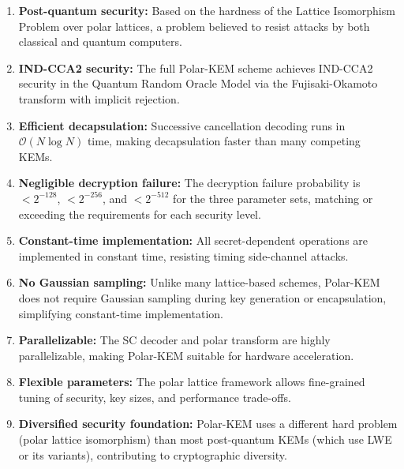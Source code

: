 \documentclass[11pt,a4paper]{article}
\newcommand{\polarKem}{\textsf{Polar-KEM}\xspace}
\begin{document}
\begin{enumerate}[leftmargin=2em]
\item \textbf{Post-quantum security:} Based on the hardness of the Lattice Isomorphism Problem over polar lattices, a problem believed to resist attacks by both classical and quantum computers.

\item \textbf{IND-CCA2 security:} The full \polarKem scheme achieves IND-CCA2 security in the Quantum Random Oracle Model via the Fujisaki-Okamoto transform with implicit rejection.

\item \textbf{Efficient decapsulation:} Successive cancellation decoding runs in $\mathcal{O}(N \log N)$ time, making decapsulation faster than many competing KEMs.

\item \textbf{Negligible decryption failure:} The decryption failure probability is $< 2^{-128}$, $< 2^{-256}$, and $< 2^{-512}$ for the three parameter sets, matching or exceeding the requirements for each security level.

\item \textbf{Constant-time implementation:} All secret-dependent operations are implemented in constant time, resisting timing side-channel attacks.

\item \textbf{No Gaussian sampling:} Unlike many lattice-based schemes, \polarKem does not require Gaussian sampling during key generation or encapsulation, simplifying constant-time implementation.

\item \textbf{Parallelizable:} The SC decoder and polar transform are highly parallelizable, making \polarKem suitable for hardware acceleration.

\item \textbf{Flexible parameters:} The polar lattice framework allows fine-grained tuning of security, key sizes, and performance trade-offs.

\item \textbf{Diversified security foundation:} \polarKem uses a different hard problem (polar lattice isomorphism) than most post-quantum KEMs (which use LWE or its variants), contributing to cryptographic diversity.
\end{enumerate}

\end{document}
